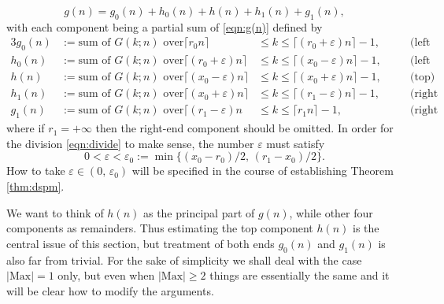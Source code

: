 \documentclass[a4paper,12pt]{article}
\theoremstyle{plain}
\def\ve{\varepsilon}
\def\Mm{\mathrm{M{\scriptstyle ax}}}
\begin{document}
\begin{equation*}  
g(n) = g_0(n) + h_0(n) + h(n) + h_1(n) + g_1(n),      
\end{equation*}
with each component being a partial sum of \eqref{eqn:g(n)} defined by  
\begin{alignat}{3}
g_0(n) &:= \mbox{sum of $G(k; n)$ over} \,\, & \lceil r_0 n \rceil & \le k \le \lceil (r_0 + \ve) n \rceil-1, \quad 
& & \mbox{(left end)} \nonumber \\ 
h_0(n) &:= \mbox{sum of $G(k; n)$ over} \,\, & \lceil (r_0 + \ve) n \rceil & \le k \le \lceil (x_0 -\ve) n \rceil-1, \quad 
& & \mbox{(left side)} \nonumber \\
h(n) &:= \mbox{sum of $G(k; n)$ over} \,\, & \lceil (x_0-\ve) n \rceil & \le k \le \lceil (x_0 +\ve) n \rceil-1, \quad 
& & \mbox{(top)}  \label{eqn:divide} \\
h_1(n) &:= \mbox{sum of $G(k; n)$ over} \,\, & \lceil (x_0 +\ve) n \rceil & \le k \le \lceil (r_1-\ve) n \rceil-1, \quad 
& & \mbox{(right side)} \nonumber \\
g_1(n) &:= \mbox{sum of $G(k; n)$ over} \,\, & \lceil (r_1 -\ve) n & \le k \le \lceil r_1 n \rceil-1,  \quad 
& & \mbox{(right end)} \nonumber 
\end{alignat}
where if $r_1 = + \infty$ then the right-end component should be omitted.    
In order for the division \eqref{eqn:divide} to make sense, the number $\ve$ must satisfy     
\begin{equation} \label{eqn:ve}
0 < \ve < \ve_0 := \min \{ (x_0 -r_0)/2, \, (r_1-x_0)/2 \}. 
\end{equation}
How to take $\ve \in (0, \, \ve_0)$ will be specified in the course of establishing 
Theorem \ref{thm:dspm}. 
\par
We want to think of $h(n)$ as the principal part of $g(n)$, while other 
four components as remainders.  
Thus estimating the top component $h(n)$ is the central issue of this section, 
but treatment of both ends $g_0(n)$ and $g_1(n)$ is also far from trivial.       
For the sake of simplicity we shall deal with the case $|\Mm| = 1$ only, 
but even when $|\Mm| \ge 2$ things are essentially the same and it 
will be clear how to modify the arguments.  
\end{document}

